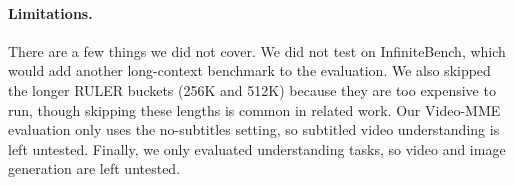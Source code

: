 \paragraph{Limitations.}
There are a few things we did not cover. We did not test on InfiniteBench, which would add another long-context benchmark to the evaluation. We also skipped the longer RULER buckets (256K and 512K) because they are too expensive to run, though skipping these lengths is common in related work. Our Video-MME evaluation only uses the no-subtitles setting, so subtitled video understanding is left untested. Finally, we only evaluated understanding tasks, so video and image generation are left untested.


